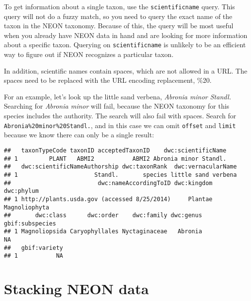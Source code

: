 \documentclass[]{book}
\newenvironment{Shaded}{\begin{snugshade}}{\end{snugshade}}
\newcommand{\DataTypeTok}[1]{\textcolor[rgb]{0.13,0.29,0.53}{#1}}
\newcommand{\KeywordTok}[1]{\textcolor[rgb]{0.13,0.29,0.53}{\textbf{#1}}}
\newcommand{\NormalTok}[1]{#1}
\newcommand{\OperatorTok}[1]{\textcolor[rgb]{0.81,0.36,0.00}{\textbf{#1}}}
\newcommand{\StringTok}[1]{\textcolor[rgb]{0.31,0.60,0.02}{#1}}
\begin{document}
To get information about a single taxon, use the \texttt{scientificname}
query. This query will not do a fuzzy match, so you need to query
the exact name of the taxon in the NEON taxonomy. Because of this,
the query will be most useful when you already have NEON data in
hand and are looking for more information about a specific taxon.
Querying on \texttt{scientificname} is unlikely to be an efficient way to
figure out if NEON recognizes a particular taxon.

In addition, scientific names contain spaces, which are not
allowed in a URL. The spaces need to be replaced with the URL
encoding replacement, \%20.

For an example, let's look up the little sand verbena, \emph{Abronia
minor Standl.} Searching for \emph{Abronia minor} will fail, because
the NEON taxonomy for this species includes the authority. The
search will also fail with spaces. Search for
\texttt{Abronia\%20minor\%20Standl.}, and in this case we can omit
\texttt{offset} and \texttt{limit} because we know there can only be a single
result:

\begin{Shaded}
\end{Shaded}

\begin{verbatim}
##   taxonTypeCode taxonID acceptedTaxonID    dwc:scientificName
## 1         PLANT   ABMI2           ABMI2 Abronia minor Standl.
##   dwc:scientificNameAuthorship dwc:taxonRank  dwc:vernacularName
## 1                      Standl.       species little sand verbena
##                         dwc:nameAccordingToID dwc:kingdom    dwc:phylum
## 1 http://plants.usda.gov (accessed 8/25/2014)     Plantae Magnoliophyta
##       dwc:class      dwc:order    dwc:family dwc:genus gbif:subspecies
## 1 Magnoliopsida Caryophyllales Nyctaginaceae   Abronia              NA
##   gbif:variety
## 1           NA
\end{verbatim}

\hypertarget{stacking-neon-data}{%
\section{Stacking NEON data}\label{stacking-neon-data}}
\end{document}
